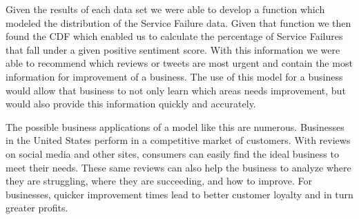 \documentclass[titlepage,letterpaper]{article}
\begin{document}
Given the results of each data set we were able to develop a function which modeled the distribution of the Service Failure data. Given that function we then found the CDF which enabled us to calculate the percentage of Service Failures that fall under a given positive sentiment score. With this information we were able to recommend which reviews or tweets are most urgent and contain the most information for improvement of a business. The use of this model for a business would allow that business to not only learn which areas needs improvement, but  would also provide this information quickly and accurately.

The possible business applications of a model like this are numerous. Businesses in the United States perform in a competitive market of customers. With reviews on social media and other sites, consumers can easily find the ideal business to meet their needs. These same reviews can also help the business to analyze where they are struggling, where they are succeeding, and how to improve. For businesses, quicker improvement times lead to better customer loyalty and in turn greater profits.   



\clearpage 

\printbibliography
\end{document}
